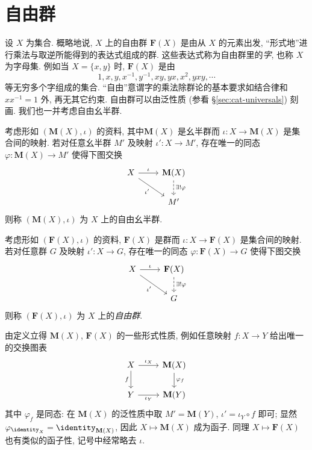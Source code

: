 \section{自由群}\label{sec:free-group}
设 $X$ 为集合. 概略地说, $X$ 上的自由群 $\mathbf{F}(X)$ 是由从 $X$ 的元素出发, ``形式地''进行乘法与取逆所能得到的表达式组成的群. 这些表达式称为自由群里的\emph{字}, 也称 $X$ 为字母集. 例如当 $X=\{x,y\}$ 时, $\mathbf{F}(X)$ 是由
\[ 1, x, y, x^{-1}, y^{-1}, xy, yx, x^2, yxy, \cdots \]
等无穷多个字组成的集合. ``自由''意谓字的乘法除群论的基本要求如结合律和 $x x^{-1}=1$ 外, 再无其它约束. 自由群可以由泛性质 (参看 \S\ref{sec:cat-universals}) 刻画. 我们也一并考虑自由幺半群.

\begin{definition}[自由幺半群]\label{def:free-monoid}
	考虑形如 $(\mathbf{M}(X), \iota)$ 的资料, 其中$\mathbf{M}(X)$ 是幺半群而 $\iota: X \to \mathbf{M}(X)$ 是集合间的映射. 若对任意幺半群 $M'$ 及映射 $\iota': X \to M'$, 存在唯一的同态 $\varphi: \mathbf{M}(X) \to M'$ 使得下图交换
	\[ \begin{tikzcd}
		X \arrow[r, "\iota"] \arrow[rd, "{\iota'}"'] & \mathbf{M}(X) \arrow[dashed, d, "{\exists! \varphi}"] \\
		& M'
	\end{tikzcd} \]
	则称 $(\mathbf{M}(X), \iota)$ 为 $X$ 上的自由幺半群.
\end{definition}

\begin{definition}[自由群]\label{def:free-group}
	考虑形如 $(\mathbf{F}(X), \iota)$ 的资料, $\mathbf{F}(X)$ 是群而 $\iota: X \to \mathbf{F}(X)$ 是集合间的映射. 若对任意群 $G$ 及映射 $\iota': X \to G$, 存在唯一的同态 $\varphi: \mathbf{F}(X) \to G$ 使得下图交换
	\[ \begin{tikzcd}
		X \arrow[r, "\iota"] \arrow[rd, "{\iota'}"'] & \mathbf{F}(X) \arrow[dashed, d, "{\exists! \varphi}"] \\
		& G
	\end{tikzcd} \]
	则称 $(\mathbf{F}(X), \iota)$ 为 $X$ 上的\emph{自由群}.
\end{definition}

由定义立得 $\mathbf{M}(X)$, $\mathbf{F}(X)$ 的一些形式性质, 例如任意映射 $f: X \to Y$ 给出唯一的交换图表
\[ \begin{tikzcd}
	X \arrow[d, "f"'] \arrow[r, "{\iota_X}"] & \mathbf{M}(X) \arrow[d, "{\varphi_f}"] \\
	Y \arrow[r, "{\iota_Y}"'] & \mathbf{M}(Y)
\end{tikzcd} \]
其中 $\varphi_f$ 是同态: 在 $\mathbf{M}(X)$ 的泛性质中取 $M' = \mathbf{M}(Y)$, $\iota' = \iota_Y \circ f$ 即可; 显然 $\varphi_{\identity_X} = \identity_{\mathbf{M}(X)}$, 因此 $X \mapsto \mathbf{M}(X)$ 成为函子. 同理 $X \mapsto \mathbf{F}(X)$ 也有类似的函子性, 记号中经常略去 $\iota$.

